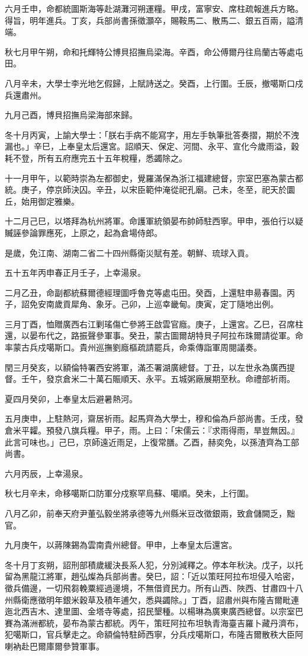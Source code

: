 \begin{pinyinscope}
六月壬申，命都統圖斯海等赴湖灘河朔運糧。甲戌，富寧安、席柱疏報進兵方略。得旨，明年進兵。丁亥，兵部尚書孫徵灝卒，賜鞍馬二、散馬二、銀五百兩，謚清端。

秋七月甲午朔，命和托輝特公博貝招撫烏梁海。辛酉，命公傅爾丹往烏蘭古等處屯田。

八月辛未，大學士李光地乞假歸，上賦詩送之。癸酉，上行圍。壬辰，撤噶斯口戍兵還肅州。

九月己酉，博貝招撫烏梁海部來歸。

冬十月丙寅，上諭大學士：「朕右手病不能寫字，用左手執筆批答奏摺，期於不洩漏也。」辛巳，上奉皇太后還宮。詔順天、保定、河間、永平、宣化今歲雨溢，穀耗不登，所有五府應完五十五年稅糧，悉蠲除之。

十一月甲午，以範時崇為左都御史，覺羅滿保為浙江福建總督，宗室巴塞為蒙古都統。庚子，停京師決囚。辛丑，以宋臣範仲淹從祀孔廟。己未，冬至，祀天於圜丘，始用御定雅樂。

十二月己巳，以塔拜為杭州將軍。命護軍統領晏布帥師駐西寧。甲申，張伯行以疑贓誣參論罪應死，上原之，起為倉場侍郎。

是歲，免江南、湖南二省二十四州縣衛災賦有差。朝鮮、琉球入貢。

五十五年丙申春正月壬子，上幸湯泉。

二月乙丑，命副都統蘇爾德經理圖呼魯克等處屯田。癸酉，上還駐申昜春園。丙子，詔免安南歲貢犀角、象牙。己卯，上巡幸畿甸。庚寅，定丁隨地出例。

三月丁酉，恤贈廣西右江剿瑤傷亡參將王啟雲官廕。庚子，上還宮。乙巳，召席柱還，以晏布代之，路振聲參軍事。癸丑，蒙古圖爾胡特貝子阿拉布珠爾請從軍。命率蒙古兵戍噶斯口。貴州巡撫劉廕樞疏請罷兵，命乘傳詣軍周閱議奏。

閏三月癸亥，以額倫特署西安將軍，滿丕署湖廣總督。丁丑，以左世永為廣西提督。壬午，發京倉米二十萬石賑順天、永平。五城粥廠展期至秋。命禮部祈雨。

夏四月癸卯，上奉皇太后避暑熱河。

五月庚申，上駐熱河，齋居祈雨。起馬齊為大學士，穆和倫為戶部尚書。壬戌，發倉米平糶。預發八旗兵糧。甲子，雨。上曰：「宋儒云：『求雨得雨，旱豈無因。』此言可味也。」己巳，京師遠近雨足，上復常膳。乙酉，赫奕免，以孫渣齊為工部尚書。

六月丙辰，上幸湯泉。

秋七月辛未，命移噶斯口防軍分戍察罕烏蘇、噶順。癸未，上行圍。

八月乙卯，前奉天府尹董弘毅坐將承德等九州縣米豆改徵銀兩，致倉儲闕乏，黜官。

九月庚午，以蔣陳錫為雲南貴州總督。甲申，上奉皇太后還宮。

冬十月丁亥朔，詔刑部積歲緩決長系人犯，分別減釋之。停本年秋決。戊子，以托留為黑龍江將軍，趙弘燦為兵部尚書。癸巳，詔：「近以策旺阿拉布坦侵入哈密，徵兵備邊，一切飛芻輓粟經過邊境，不無借資民力。所有山西、陜西、甘肅四十八州縣衛應徵明年銀米穀草及積年逋欠，悉與蠲除。」丁酉，詔肅州與布隆吉爾毗連迤北西吉木、達里圖、金塔寺等處，招民墾種。以楊琳為廣東廣西總督。以宗室巴賽為滿洲都統，晏布為蒙古都統。丙午，策旺阿拉布坦執青海臺吉羅卜藏丹濟布，犯噶斯口，官兵擊走之。命額倫特駐師西寧，分兵戍噶斯口，布隆吉爾散秩大臣阿喇衲赴巴爾庫爾參贊軍事。


\end{pinyinscope}
